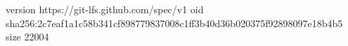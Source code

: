 version https://git-lfs.github.com/spec/v1
oid sha256:2c7eaf1a1c58b341cf898779837008c1ff3b40d36b020375f92898097e18b4b5
size 22004
